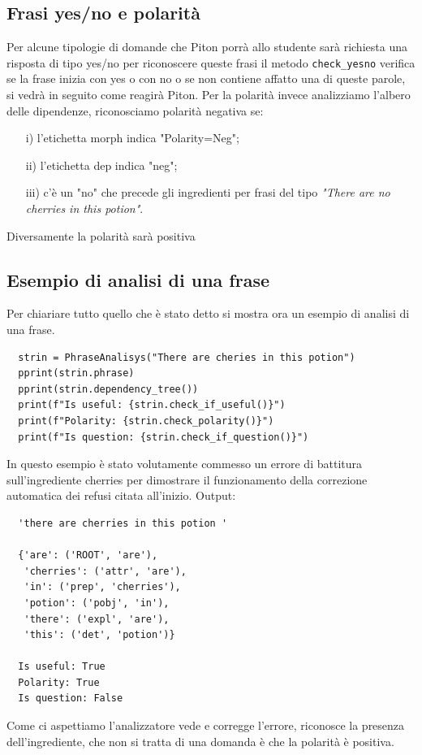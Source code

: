 \subsection{Frasi yes/no e polarità}
Per alcune tipologie di domande che Piton porrà allo studente sarà richiesta una risposta di tipo yes/no per riconoscere queste frasi il metodo \texttt{check\_yesno} verifica se la frase inizia con yes o con no o se non contiene affatto una di queste parole, si vedrà in seguito come reagirà Piton.
Per la polarità invece analizziamo l'albero delle dipendenze, riconosciamo polarità negativa se:
\begin{itemize}
    \item[i)] l'etichetta morph indica "Polarity=Neg";
    \item[ii)] l'etichetta dep indica "neg";
    \item[iii)] c'è un "no" che precede gli ingredienti per frasi del tipo \textit{"There are no cherries in this potion"}.
\end{itemize}
Diversamente la polarità sarà positiva
\subsection{Esempio di analisi di una frase}
Per chiariare tutto quello che è stato detto si mostra ora un esempio di analisi di una frase.
\begin{lstlisting}
  strin = PhraseAnalisys("There are cheries in this potion")
  pprint(strin.phrase)
  pprint(strin.dependency_tree())
  print(f"Is useful: {strin.check_if_useful()}")
  print(f"Polarity: {strin.check_polarity()}")
  print(f"Is question: {strin.check_if_question()}")
\end{lstlisting}
In questo esempio è stato volutamente commesso un errore di battitura sull'ingrediente cherries per dimostrare il funzionamento della correzione automatica dei refusi citata all'inizio.
\newline
\newline
Output:
\begin{lstlisting}
  'there are cherries in this potion '

  {'are': ('ROOT', 'are'),
   'cherries': ('attr', 'are'),
   'in': ('prep', 'cherries'),
   'potion': ('pobj', 'in'),
   'there': ('expl', 'are'),
   'this': ('det', 'potion')}

  Is useful: True
  Polarity: True
  Is question: False
\end{lstlisting}

Come ci aspettiamo l'analizzatore vede e corregge l'errore, riconosce la presenza dell'ingrediente, che non si tratta di una domanda è che la polarità è positiva.